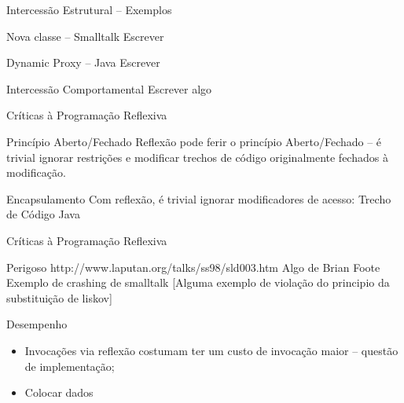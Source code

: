 \documentclass[12pt,t]{beamer}
\begin{document}
 	 \begin{frame}{Intercessão Estrutural -- Exemplos}
 	 	\begin{exampleblock}{Nova classe -- Smalltalk}
 	 		\alert{Escrever}
 	 	\end{exampleblock}
 	 	\begin{exampleblock}{Dynamic Proxy -- Java}
 	 		\alert{Escrever}
 	 	\end{exampleblock}
 	 \end{frame}
 	 \begin{frame}{Intercessão Comportamental}
 	 	\alert{Escrever algo}
 	 \end{frame}
 	 \begin{frame}{Críticas à Programação Reflexiva}
 	 	\begin{block}{Princípio Aberto/Fechado}
 	 		Reflexão pode ferir o princípio Aberto/Fechado \cite{meyer1988object} -- é trivial ignorar restrições e modificar trechos de código originalmente fechados à modificação.
 	 	\end{block}
 	 	\begin{block}{Encapsulamento}
 	 		Com reflexão, é trivial ignorar modificadores de acesso:
 	 		\alert{Trecho de Código Java} 
 	 	\end{block}
 	 \end{frame}
 	 \begin{frame}{Críticas à Programação Reflexiva}
 	 	\begin{block}{Perigoso}
 	 		http://www.laputan.org/talks/ss98/sld003.htm
 	 		\alert{Algo de Brian Foote}
 	 		\alert{Exemplo de crashing de smalltalk}
 	 		\alert{[Alguma exemplo de violação do principio da substituição de liskov]}
 	 	\end{block}
 	 	\begin{block}{Desempenho}
 	 		\begin{itemize}
 	 			\item Invocações via reflexão costumam ter um custo de invocação maior -- \alert{questão de implementação};
 	 			\item \alert{Colocar dados}
 	 		\end{itemize}
 	 	\end{block}
 	 \end{frame}
\end{document}
